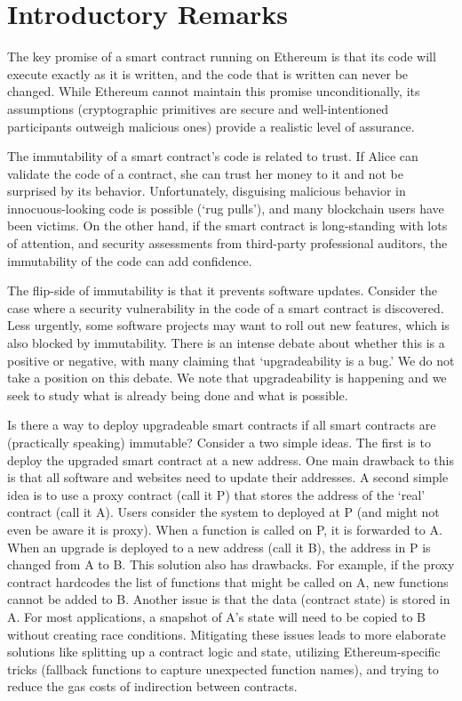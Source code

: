 

\section{Introductory Remarks}

The key promise of a smart contract running on Ethereum is that its code will execute exactly as it is written, and the code that is written can never be changed. While Ethereum cannot maintain this promise unconditionally, its assumptions (\eg cryptographic primitives are secure and well-intentioned participants outweigh malicious ones) provide a realistic level of assurance. 

The immutability of a smart contract's code is related to trust. If Alice can validate the code of a contract, she can trust her money to it and not be surprised by its behavior. Unfortunately, disguising malicious behavior in innocuous-looking code is possible (`rug pulls'), and many blockchain users have been victims. On the other hand, if the smart contract is long-standing with lots of attention, and security assessments from third-party professional auditors, the immutability of the code can add confidence. 

The flip-side of immutability is that it prevents software updates. Consider the case where a security vulnerability in the code of a smart contract is discovered. Less urgently, some software projects may want to roll out new features, which is also blocked by immutability. There is an intense debate about whether this is a positive or negative, with many claiming that `upgradeability is a bug.' We do not take a position on this debate. We note that upgradeability is happening and we seek to study what is already being done and what is possible. 

Is there a way to deploy upgradeable smart contracts if all smart contracts are (practically speaking) immutable? Consider a two simple ideas. The first is to deploy the upgraded smart contract at a new address. One main drawback to this is that all software and websites need to update their addresses. A second simple idea is to use a proxy contract (call it P) that stores the address of the `real' contract (call it A). Users consider the system to deployed at P (and might not even be aware it is proxy). When a function is called on P, it is forwarded to A. When an upgrade is deployed to a new address (call it B), the address in P is changed from A to B. This solution also has drawbacks. For example, if the proxy contract hardcodes the list of functions that might be called on A, new functions cannot be added to B. Another issue is that the data (contract state) is stored in A. For most applications, a snapshot of A's state will need to be copied to B without creating race conditions. Mitigating these issues leads to more elaborate solutions like splitting up a contract logic and state, utilizing Ethereum-specific tricks (fallback functions to capture unexpected function names), and trying to reduce the gas costs of indirection between contracts.

